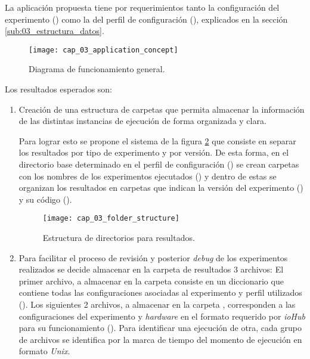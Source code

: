 \documentclass[\main/main.tex]{subfiles}
\begin{document}
			La aplicación propuesta tiene por requerimientos tanto la configuración del experimento () como la del perfil de configuración (), explicados en la sección \ref{sub:03_estructura_datos}.

			\begin{figure}[H]
				\centering
				\texttt{[image: cap\_03\_application\_concept]}
				\caption{Diagrama de funcionamiento general.}
				\label{fig:03_application_concept}
			\end{figure} 

			Los resultados esperados son:
			\begin{enumerate}\setlength\itemsep{-0.5em}
				\item Creación de una estructura de carpetas que permita almacenar la información de las distintas instancias de ejecución de forma organizada y clara. 

				Para lograr esto se propone el sistema de la figura \ref{fig:03_folder_structure} que consiste en separar los resultados por tipo de experimento y por versión. De esta forma, en el directorio base determinado en el perfil de configuración () se crean carpetas con los nombres de los experimentos ejecutados () y dentro de estas se organizan los resultados en carpetas que indican la versión del experimento () y su código ().  
				\begin{figure}[H]
					\centering
					\texttt{[image: cap\_03\_folder\_structure]}
					\caption{Estructura de directorios para resultados.}
					\label{fig:03_folder_structure}
				\end{figure} 

				\item Para facilitar el proceso de revisión y posterior \textit{debug} de los experimentos realizados se decide almacenar en la carpeta de resultados 3 archivos: El primer archivo, a almacenar en la carpeta  consiste en un diccionario que contiene todas las configuraciones asociadas al experimento y perfil utilizados (). Los siguientes 2 archivos, a almacenar en la carpeta , corresponden a las configuraciones del experimento y \textit{hardware} en el formato requerido por \textit{ioHub} para su funcionamiento (). Para identificar una ejecución de otra, cada grupo de archivos se identifica por la marca de tiempo del momento de ejecución en formato \textit{Unix}.


\end{enumerate}
\end{document}
